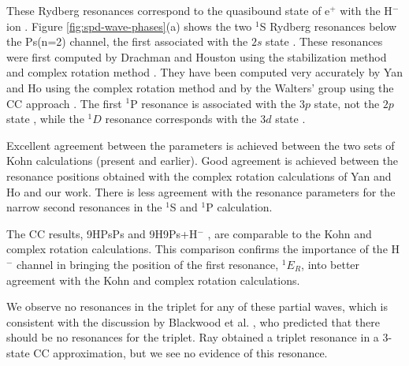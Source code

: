 \documentclass[preprint,showpacs,preprintnumbers,amsmath,amssymb,longbibliography,pra,aps]{revtex4-1}
\begin{document}
These Rydberg resonances correspond to the quasibound state of e$^+$ with the H$^-$ ion \cite{Drachman1979}.
Figure \ref{fig:spd-wave-phases}(a) shows the two $^1$S Rydberg resonances below the
Ps(n=2) channel, the first associated with the $2s$ state \cite{DiRienzi2002b}.
These resonances were first computed by Drachman and Houston using the stabilization
method and complex rotation method \cite{Drachman1975}. They have been computed very accurately by Yan and Ho
using the complex rotation method \cite{Yan1999} and by the Walters' group using the CC approach \cite{Walters2004}. The first $^1$P resonance is associated with the $3p$ state, not the $2p$ state \cite{DiRienzi2002b}, while the $^1D$ resonance corresponds with the $3d$ state \cite{DiRienzi2002a}.

Excellent agreement between the parameters is achieved between the two sets of Kohn calculations (present and earlier). Good agreement is achieved between the resonance positions obtained with the complex rotation calculations of Yan and Ho \cite{Yan1999,Yan1998a,Ho1998,Ho2000} and our work. There is less agreement with the resonance parameters for the narrow second resonances in the $^1$S and $^1$P calculation.

The CC results, 9HPsPs \cite{Blackwood2002} and 9H9Ps+H$^-$ \cite{Walters2004}, are comparable to the Kohn and complex rotation calculations. This comparison confirms the importance of the H$^-$ channel in bringing the position of the first resonance, $^1E_R$, into better agreement with the Kohn and complex rotation calculations.

We observe no resonances in the triplet for any of these partial waves, which is consistent with the discussion by Blackwood et al. \cite{Blackwood2002}, who predicted that there should be no resonances for the triplet. Ray \cite{Ray2006} obtained a triplet resonance in a 3-state CC approximation, but we see no evidence of this resonance.
\end{document}
